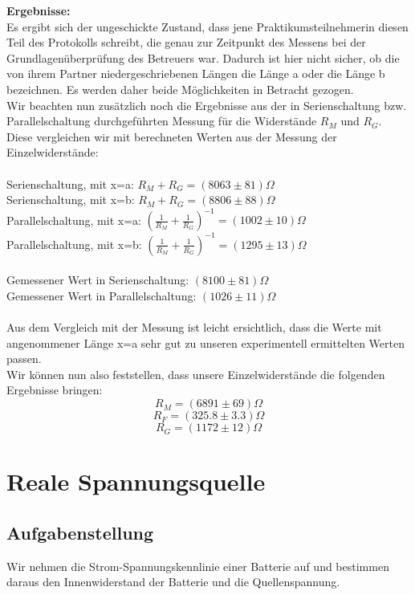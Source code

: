 \documentclass{article}
\begin{document}
\newpage

\textbf{Ergebnisse:}\\
Es ergibt sich der ungeschickte Zustand, dass jene Praktikumsteilnehmerin diesen Teil des Protokolls schreibt, die genau zur Zeitpunkt des Messens bei der Grundlagenüberprüfung des Betreuers war. Dadurch ist hier nicht sicher, ob die von ihrem Partner niedergeschriebenen Längen die Länge a oder die Länge b bezeichnen. Es werden daher beide Möglichkeiten in Betracht gezogen.\\
Wir beachten nun zusätzlich noch die Ergebnisse aus der in Serienschaltung bzw. Parallelschaltung durchgeführten Messung für die Widerstände $R_M$ und $R_G$. Diese vergleichen wir mit berechneten Werten aus der Messung der Einzelwiderstände:\\
\\
Serienschaltung, mit x=a: $R_M+R_G=(8063 \pm 81)\Omega$\\
Serienschaltung, mit x=b: $R_M+R_G=(8806 \pm 88)\Omega$\\
Parallelschaltung, mit x=a: $(\frac{1}{R_M}+\frac{1}{R_G})^{-1}=(1002 \pm 10)\Omega$\\
Parallelschaltung, mit x=b: $(\frac{1}{R_M}+\frac{1}{R_G})^{-1}=(1295 \pm 13)\Omega$\\
\\
Gemessener Wert in Serienschaltung: $(8100 \pm 81)\Omega$\\
Gemessener Wert in Parallelschaltung: $(1026 \pm 11)\Omega$\\
\\
Aus dem Vergleich mit der Messung ist leicht ersichtlich, dass die Werte mit angenommener Länge x=a sehr gut zu unseren experimentell ermittelten Werten passen.\\
Wir können nun also feststellen, dass unsere Einzelwiderstände die folgenden Ergebnisse bringen:\\
$$R_M=(6891 \pm 69)\Omega$$
$$R_F=(325.8 \pm 3.3)\Omega$$
$$R_G=(1172 \pm 12)\Omega$$




\newpage



\section{Reale Spannungsquelle}

\subsection{Aufgabenstellung}
Wir nehmen die Strom-Spannungskennlinie einer Batterie auf und bestimmen daraus den Innenwiderstand der Batterie und die Quellenspannung.
\end{document}
